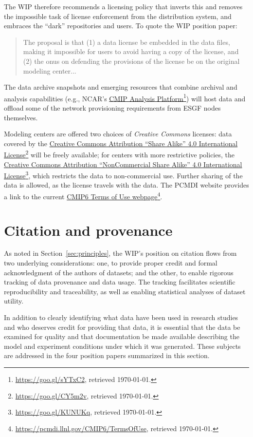 \documentclass[gmd,manuscript]{copernicus}
\newcommand{\urlref}[2] {\href{#1}{#2}\footnote{\url{#1}, retrieved \today.}}
\begin{document}
The WIP therefore recommends a licensing policy that inverts this and
removes the impossible task of license enforcement from the distribution 
system, and embraces the ``dark'' repositories and users.
To quote the WIP position paper:

\begin{quote}
  The proposal is that (1) a data license be embedded in the data
  files, making it impossible for users to avoid having a copy of the
  license, and (2) the onus on defending the provisions of the license
  be on the original modeling center...
\end{quote}

The data archive snapshots and emerging resources that combine
archival and analysis capabilities (e.g., NCAR's
\urlref{https://goo.gl/sYTxC2}{CMIP Analysis Platform}) will host data
and offload some of the network provisioning requirements from ESGF
nodes themselves.

Modeling centers are offered two choices of \emph{Creative Commons}
licenses: data covered by the \urlref{https://goo.gl/CY5m2v}{Creative
  Commons Attribution ``Share Alike'' 4.0 International License} will
be freely available; for centers with more restrictive policies, the
\urlref{https://goo.gl/KUNUKq}{Creative Commons Attribution
  ``NonCommercial Share Alike'' 4.0 International License}, which
restricts the data to non-commercial use. Further sharing of the data
is allowed, as the license travels with the data. The PCMDI website
provides a link to the current
\urlref{https://pcmdi.llnl.gov/CMIP6/TermsOfUse}{CMIP6 Terms of Use
  webpage}.

\section{Citation and provenance}
\label{sec:cite}

As noted in Section~\ref{sec:principles}, the WIP's position on citation flows
from two underlying considerations: one, to provide proper credit and
formal acknowledgment of the authors of datasets; and the other, to
enable rigorous tracking of data provenance and data usage. The
tracking facilitates scientific reproducibility and traceability, as
well as enabling statistical analyses of dataset utility.

In addition to clearly identifying what data have been used in
research studies and who deserves credit for providing that data, it
is essential that the data be examined for quality and that
documentation be made available describing the model and experiment
conditions under which it was generated. These subjects are addressed
in the four position papers summarized in this section.
\end{document}
